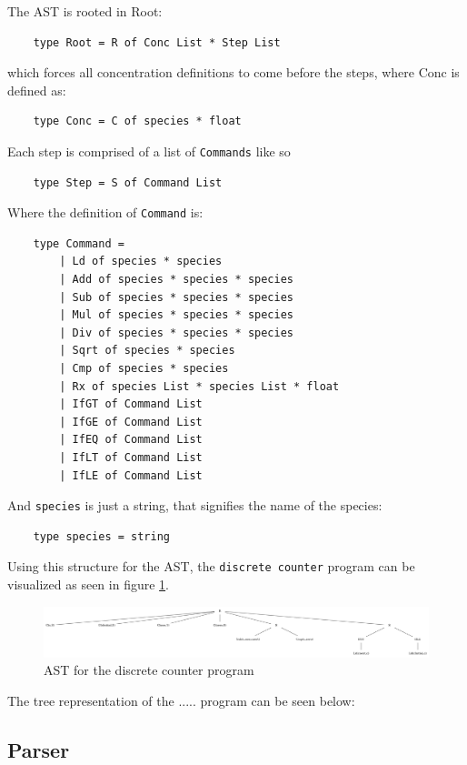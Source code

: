 The AST is rooted in Root: 
\begin{verbatim}
    type Root = R of Conc List * Step List
\end{verbatim}
which forces all concentration definitions to come before the steps, where Conc is defined as:
\begin{verbatim}
    type Conc = C of species * float
\end{verbatim}
Each step is comprised of a list of \texttt{Commands} like so
\begin{verbatim}
    type Step = S of Command List
\end{verbatim}
Where the definition of \texttt{Command} is:
\begin{verbatim}
    type Command =
        | Ld of species * species
        | Add of species * species * species
        | Sub of species * species * species
        | Mul of species * species * species
        | Div of species * species * species
        | Sqrt of species * species
        | Cmp of species * species
        | Rx of species List * species List * float
        | IfGT of Command List
        | IfGE of Command List
        | IfEQ of Command List
        | IfLT of Command List
        | IfLE of Command List
\end{verbatim}
And \texttt{species} is just a string, that signifies the name of the species:
\begin{verbatim}
    type species = string
\end{verbatim}

Using this structure for the AST, the \texttt{discrete counter} program can be visualized as seen in figure \ref{fig:ast_counter}. 

\begin{figure}[ht!]
    \centering
    \includegraphics[width=\textwidth]{report/figures/ast_counter.png}
    \caption{AST for the discrete counter program}
    \label{fig:ast_counter}
\end{figure}

The tree representation of the ..... program can be seen below:
\subsection{Parser}


